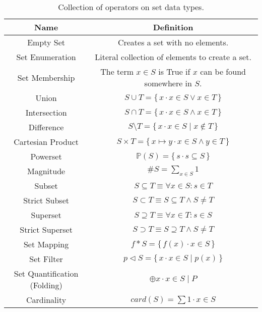 \documentclass{article}
\newcommand{\bSet}[3]{%
  \{\, #1 \cdot #2 \mid #3 \, \}%
}
\newcommand{\bSetT}[2]{%
  \{\, #1 \cdot #2 \,\}%
}
\begin{document}
\begin{table}[H]
    \centering
    \caption{Collection of operators on set data types.}
    \begin{tabular}{|c|c|}
        \hline
        Name & Definition \\ %
        \hline
        Empty Set & Creates a set with no elements.\\ %
        Set Enumeration & Literal collection of elements to create a set.\\ %
        Set Membership & The term $x \in S$ is True if $x$ can be found somewhere in $S$. \\ %
        \hline
        Union & $S \cup T = \bSetT{x}{x \in S \lor x \in T}$ \\ %
        Intersection & $S \cap T = \bSetT{x}{x \in S \land x \in T}$ \\ %
        Difference & $S \setminus T = \bSet{x}{x \in S}{x \notin T}$ \\ %
        Cartesian Product & $S \times T = \bSetT{x \mapsto y}{x \in S \land y \in T}$ \\ %
        \hline
        Powerset & $\mathbb{P}(S) = \bSetT{s}{s \subseteq S }$ \\ %
        Magnitude & $\#S = \sum_{x \in S} 1$\\ %
        Subset & $S \subseteq T \equiv \forall x \in S: s \in T$ \\ %
        Strict Subset & $S \subset T \equiv S \subseteq T \land S \neq T$ \\ %
        Superset & $S \supseteq T \equiv \forall x \in T: s \in S$ \\ %
        Strict Superset & $S \supset T \equiv S \supseteq T \land S \neq T$ \\ %
        \hline
        Set Mapping & $f * S = \bSetT{f(x)}{x \in S}$\\ %
        Set Filter & $p \triangleleft S = \bSet{x}{x \in S}{p(x)}$\\ %
        Set Quantification (Folding) & $\oplus x \cdot x \in S \mid P$\\
        Cardinality & $card(S) = \sum 1 \cdot x \in S$\\
        \hline
    \end{tabular}
    \label{tab:setOps}
\end{table}
\end{document}

